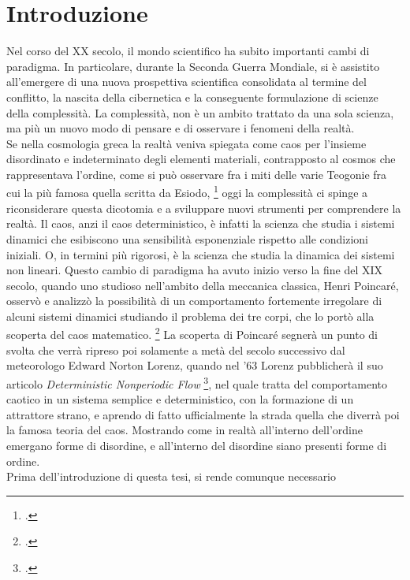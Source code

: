 
\section{Introduzione}
\label{sec:Introduzione}

Nel corso del XX secolo, il mondo scientifico ha subito importanti cambi di paradigma. 
In particolare, durante la Seconda Guerra Mondiale, 
si è assistito all'emergere di una nuova prospettiva scientifica consolidata al termine del conflitto,
la nascita della cibernetica e la conseguente formulazione
di scienze della complessità.
La complessità, non è un ambito trattato da una sola scienza,
ma più un nuovo modo di pensare e di osservare i fenomeni
della realtà. \\
Se nella cosmologia greca la realtà veniva spiegata come caos per 
l'insieme disordinato e indeterminato degli elementi materiali, 
contrapposto al cosmos che rappresentava l'ordine, 
come si può osservare fra i miti delle varie Teogonie
fra cui la più famosa quella scritta da Esiodo, \footcite{esiodoteogonia}
oggi la complessità ci spinge a riconsiderare questa dicotomia e a sviluppare 
nuovi strumenti per comprendere la realtà. 
Il caos, anzi il caos deterministico, è infatti la scienza che studia i 
sistemi dinamici che esibiscono una sensibilità esponenziale rispetto alle condizioni iniziali.
O, in termini più rigorosi, è la scienza che studia la dinamica dei sistemi non lineari.
Questo cambio di paradigma ha avuto inizio verso la fine del XIX secolo,
quando uno studioso nell'ambito della meccanica classica, Henri Poincaré,
osservò e analizzò la possibilità di un comportamento fortemente irregolare
di alcuni sistemi dinamici studiando il problema dei tre corpi,
che lo portò alla scoperta del caos matematico. \footcite{poincaréproblema}
La scoperta di Poincaré segnerà un punto di svolta che verrà
ripreso poi solamente a metà del secolo successivo dal meteorologo
Edward Norton Lorenz,
quando nel '63 Lorenz pubblicherà il suo articolo 
\textit{Deterministic Nonperiodic Flow} \footcite{Lorenzdnf},
nel quale tratta del comportamento caotico in un sistema semplice
e deterministico, con la formazione di un attrattore strano,
e aprendo di fatto ufficialmente la strada quella che diverrà poi
la famosa teoria del caos.
Mostrando come in realtà all'interno dell'ordine emergano forme di disordine,
e all'interno del disordine siano presenti forme di ordine. \\
Prima dell'introduzione di questa tesi, si rende comunque necessario
